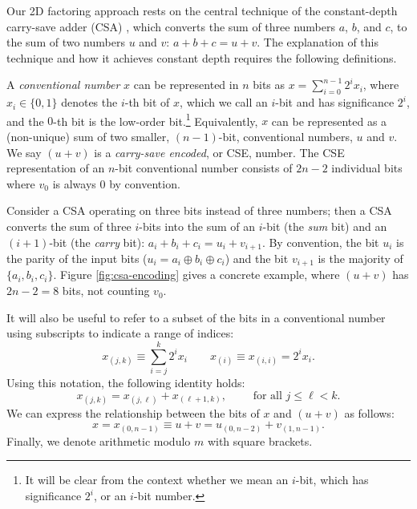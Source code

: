 \documentclass[twoside]{article}
\begin{document}
Our 2D factoring approach rests on the central technique of the constant-depth
carry-save adder (CSA) \cite{Gossett1998}, which converts the sum of three
numbers $a$, $b$, and $c$, to the sum of two numbers $u$ and $v$:
$a+b+c = u+v$. The explanation of this technique and how it achieves constant depth requires the following definitions.

A \emph{conventional number} $x$ can be represented in $n$ bits as
$x = \sum_{i=0}^{n-1} 2^i x_i$,
where $x_i \in \{0,1\}$ denotes the $i$-th bit of $x$, which we call
an $i$-bit and has significance $2^i$, and the $0$-th bit is the low-order bit.\footnote{It will be clear from the context whether we mean an
$i$-bit, which has significance $2^i$, or an $i$-bit number.}
Equivalently, $x$ can be represented as a (non-unique)
sum of two smaller, $(n-1)$-bit, conventional numbers, $u$ and $v$.
We say $(u+v)$ is a \emph{carry-save encoded}, or CSE, number.
The CSE representation of an $n$-bit conventional number
consists of $2n-2$ individual
bits where $v_0$ is always $0$ by convention.

Consider a CSA operating on three bits instead of three numbers; 
then a CSA converts the sum of three
$i$-bits into the sum of an $i$-bit (the \emph{sum} bit) and an $(i+1)$-bit
(the \emph{carry} bit):
$a_i+b_i+c_i = u_i+v_{i+1}$.
By convention, the bit $u_i$ is the parity of the input bits
($u_i = a_i \oplus b_i \oplus c_i$) and
the bit $v_{i+1}$ is the majority of $\{a_i, b_i, c_i\}$.
Figure \ref{fig:csa-encoding} gives a concrete example, where
$(u+v)$ has $2n-2 = 8$ bits, not counting $v_0$.

%
It will also be useful to refer to a subset of the bits in a conventional
number using subscripts to indicate a range of indices:
\begin{equation}
x_{(j,k)} \equiv \sum_{i=j}^k 2^ix_i \qquad
x_{(i)} \equiv x_{(i,i)} = 2^ix_i.
\end{equation}
%
Using this notation, the following identity holds:
\begin{equation}
x_{(j,k)} = x_{(j,\ell)} + x_{(\ell+1,k)}, \qquad \text{ for all } j \le \ell < k.
\end{equation}
%
We can express the relationship between the bits of $x$ and $(u+v)$ as follows:
%
\begin{equation}
x = x_{(0,n-1)} \equiv u+v = u_{(0,n-2)} + v_{(1,n-1)}.
\end{equation}
%
Finally, we denote arithmetic modulo $m$ with square brackets.
\end{document}
